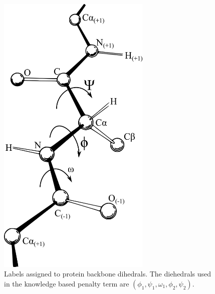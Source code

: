 \begin{figure}[h]
    \centering
    \includegraphics[width=0.65\textwidth,height=0.45\textheight,keepaspectratio]{figures/backbone_labels.png}
    \caption{Labels assigned to protein backbone dihedrals.
The diehedrals used in the knowledge based penalty term are $(\phi_{1}, \psi_{1}, \omega_{1}, \phi_{2}, \psi_{2})$.}
    \label{figure:backbone_labels}
\end{figure}

